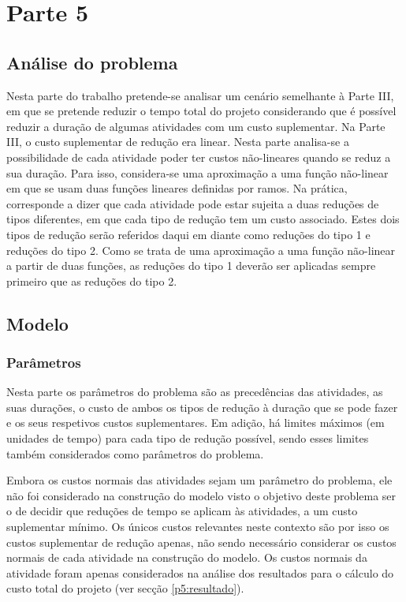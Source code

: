 \chapter{Parte 5}
\label{cap:p5}

\section{Análise do problema}

Nesta parte do trabalho pretende-se analisar um cenário semelhante à Parte III, em que se pretende reduzir o tempo total do projeto considerando que é possível reduzir a duração de algumas atividades com um custo suplementar. Na Parte III, o custo suplementar de redução era linear. Nesta parte analisa-se a possibilidade de cada atividade poder ter custos não-lineares quando se reduz a sua duração. Para isso, considera-se uma aproximação a uma função não-linear em que se usam duas funções lineares definidas por ramos. Na prática, corresponde a dizer que cada atividade pode estar sujeita a duas reduções de tipos diferentes, em que cada tipo de redução tem um custo associado. Estes dois tipos de redução serão referidos daqui em diante como reduções do tipo 1 e reduções do tipo 2. Como se trata de uma aproximação a uma função não-linear a partir de duas funções, as reduções do tipo 1 deverão ser aplicadas sempre primeiro que as reduções do tipo 2.

\section{Modelo}

\subsection{Parâmetros}

Nesta parte os parâmetros do problema são as precedências das atividades, as suas durações, o custo de ambos os tipos de redução à duração que se pode fazer e os seus respetivos custos suplementares. Em adição, há limites máximos (em unidades de tempo) para cada tipo de redução possível, sendo esses limites também considerados como parâmetros do problema.

Embora os custos normais das atividades sejam um parâmetro do problema, ele não foi considerado na construção do modelo visto o objetivo deste problema ser o de decidir que reduções de tempo se aplicam às atividades, a um custo suplementar mínimo. Os únicos custos relevantes neste contexto são por isso os custos suplementar de redução apenas, não sendo necessário considerar os custos normais de cada atividade na construção do modelo. Os custos normais da atividade foram apenas considerados na análise dos resultados para o cálculo do custo total do projeto (ver secção \ref{p5:resultado}).

